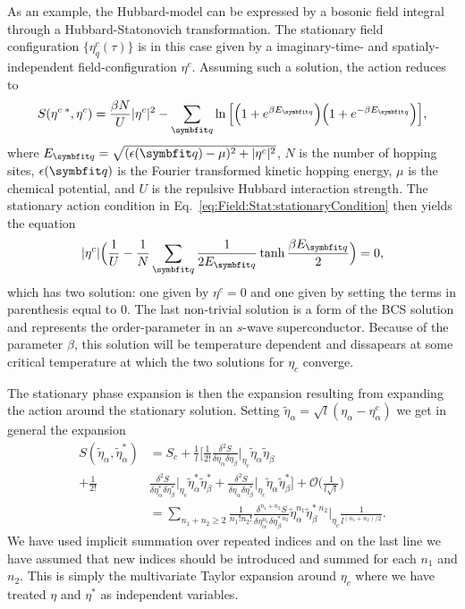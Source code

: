 As an example, the Hubbard-model can be expressed by a bosonic field integral through a Hubbard-Statonovich transformation.
The stationary field configuration $\{\eta^c_q(\tau)\}$ is in this case given by a imaginary-time- and spatialy-independent
field-configuration $\eta^c$. Assuming such a solution, the action reduces to
\begin{equation}
    \label{eq:Field:Stat:meanFieldHubbard}
    S(\eta^{c\;\ast}, \eta^c) = \frac{\beta N}{U}|\eta^c|^2 - \sum_\v{q}\ln\Big[\Big(1+e^{\beta E_\v{q}}\Big)\Big(1+e^{-\beta E_\v{q}}\Big)\Big],
\end{equation}
where $E_\v{q} = \sqrt{(\epsilon(\v{q})-\mu)^2 + |\eta^c|^2}$, $N$ is the number of hopping sites, $\epsilon(\v{q})$ is the Fourier transformed
kinetic hopping energy, $\mu$ is the chemical potential, and $U$ is the repulsive Hubbard interaction strength. The stationary action condition
in Eq.~\eqref{eq:Field:Stat:stationaryCondition} then yields the equation
\begin{equation}
    \label{eq:Field:Stat:hubbardStationary}
    |\eta^c|\Big(\frac{1}{U} - \frac{1}{N}\sum_\v{q}\frac{1}{2E_\v{q}}\tanh\frac{\beta E_\v{q}}{2}\Big) = 0,
\end{equation}
which has two solution: one given by $\eta^c = 0$ and one given by setting the terms in parenthesis equal to $0$. The last non-trivial solution
is a form of the BCS solution and represents the order-parameter in an $s$-wave superconductor. Because of the parameter $\beta$, this
solution will be temperature dependent and dissapears at some critical temperature at which the two solutions for $\eta_c$ converge.

The stationary phase expansion is then the expansion resulting from expanding the action around the stationary solution. Setting
$\tilde{\eta}_\alpha = \sqrt{l}(\eta_\alpha-\eta^c_\alpha)$ we get in general the expansion
\begin{equation}
    \label{eq:Field:Stat:stationaryPhaseExpansion}
    \begin{split}
        S(\tilde{\eta}_\alpha,\tilde{\eta}_\alpha^\ast) &= S_c + \frac{1}{l}\bigg[\frac{1}{2!}\frac{\delta^2S}{\delta\eta_\alpha\delta\eta_\beta}\Big|_{\eta_c}\tilde{\eta}_\alpha\tilde{\eta}_\beta\\
        + \frac{1}{2!}&\frac{\delta^2S}{\delta\eta_\alpha^\ast\delta\eta_\beta^\ast}\Big|_{\eta_c}\tilde{\eta}^\ast_\alpha\tilde{\eta}^\ast_\beta
        + \frac{\delta^2S}{\delta\eta_\alpha\delta\eta_\beta^\ast}\Big|_{\eta_c}\tilde{\eta}_\alpha\tilde{\eta}_\beta^\ast\bigg] +  \mathcal{O}\Big(\frac{1}{l\sqrt{l}}\Big)\\
        &= \sum_{n_1+n_2\geq 2}\frac{1}{n_1!n_2!}\frac{\delta^{n_1+n_2}S}{\delta\eta_\alpha^{n_1}\delta\eta_\beta^{\ast\;n_2}}\tilde{\eta}_\alpha^{n_1}\tilde{\eta}_\beta^{\ast\;n_2}\Big|_{\eta_c}\frac{1}{l^{(n_1+n_2)/2}}.
    \end{split}
\end{equation}
We have used implicit summation over repeated indices and on the last line we have assumed that new indices should be introduced and summed for each $n_1$ and $n_2$.
This is simply the multivariate Taylor expansion around $\eta_c$ where we have treated $\eta$ and $\eta^\ast$ as independent variables.


